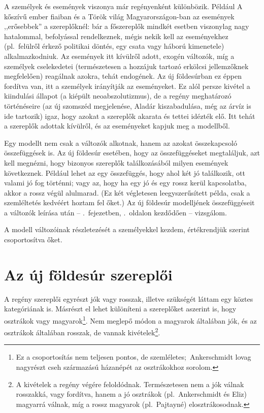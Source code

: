 \documentclass{thesis-ekf}
\theoremstyle{definition}
\begin{document}
    A személyek és események viszonya már regényenként különbözik.
    Például A kőszívű ember fiaiban és a Török világ Magyarországon-ban az események ,,erősebbek'' a szereplőknél:
        bár a főszereplők mindkét esetben viszonylag nagy hatalommal, befolyással rendelkeznek, mégis nekik kell az
        eseményekhez (pl.~felülről érkező politikai döntés, egy csata vagy háború kimenetele) alkalmazkodniuk.
    Az események itt kívülről adott, exogén változók, míg a személyek cselekedetei
        (természetesen a hozzájuk tartozó erkölcsi jellemzőknek megfelelően) reagálnak azokra, tehát endogének.
    Az új földesúrban ez éppen fordítva van, itt a személyek irányítják az eseményeket.
    Ez alól persze kivétel a kiindulási állapot (a kiépült neoabszolutizmus), de a regény meghatározó történéseire
        (az új szomszéd megjelenése, Aladár kiszabadulása, még az árvíz is ide tartozik) igaz,
        hogy azokat a szereplők akarata és tettei idézték elő.
    Itt tehát a szereplők adottak kívülről, és az eseményeket kapjuk meg a modellből.

    Egy modellt nem csak a változók alkotnak, hanem az azokat összekapcsoló összefüggések is.
    Az új földesúr esetében, hogy az összefüggéseket megtaláljuk, azt kell megnézni, hogy bizonyos szereplők
        találkozásából milyen események következnek.
    Például lehet az egy összefüggés, hogy ahol két jó találkozik, ott valami jó fog történni;
        vagy az, hogy ha egy jó és egy rossz kerül kapcsolatba, akkor a rossz végül alulmarad.
    (Ez két végletesen leegyszerűsített példa, csak a szemléltetés kedvéért hoztam fel őket.)
    Az új földesúr modelljének összefüggéseit a változók leírása után -- .~fejezetben,
        .~oldalon kezdődően -- vizsgálom.

    A modell változóinak részletezését a személyekkel kezdem, értékrendjük szerint csoportosítva őket.


    \section{Az új földesúr szereplői}\label{sec:az-uj-foldesur-szereploi}

    A regény szereplői egyrészt jók vagy rosszak, illetve szükségét láttam egy köztes kategóriának is.
    Másrészt el lehet különíteni a szereplőket aszerint is, hogy osztrákok vagy magyarok\footnote{Ez a csoportosítás
        nem teljesen pontos, de szemléletes;~Ankerschmidt lovag nagyrészt cseh származású házanépét az osztrákokhoz sorolom.}.
    Nem meglepő módon a magyarok általában jók, és az osztrákok általában rosszak, de vannak kivételek\footnote{
        A kivételek a regény végére feloldódnak. Természetesen nem a jók válnak rosszakká, vagy fordítva,
        hanem a jó osztrákok (pl.~Ankerschmidt és Eliz) magyarrá válnak, míg a rossz magyarok (pl.~Pajtayné) elosztrákosodnak.}.
\end{document}

